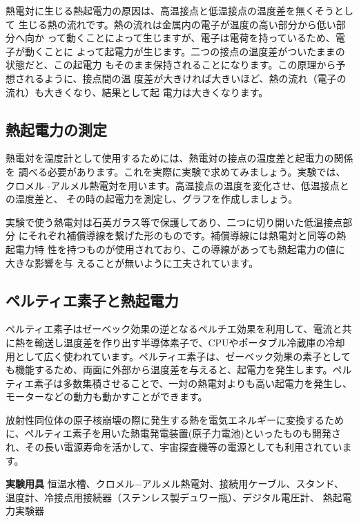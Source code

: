 熱電対に生じる熱起電力の原因は、高温接点と低温接点の温度差を無くそうとして 
生じる熱の流れです。熱の流れは金属内の電子が温度の高い部分から低い部分へ向か 
って動くことによって生じますが、電子は電荷を持っているため、電子が動くことに 
よって起電力が生じます。二つの接点の温度差がついたままの状態だと、この起電力 
もそのまま保持されることになります。この原理から予想されるように、接点間の温
度差が大きければ大きいほど、熱の流れ（電子の流れ）も大きくなり、結果として起 
電力は大きくなります。


\subsection{熱起電力の測定}

熱電対を温度計として使用するためには、熱電対の接点の温度差と起電力の関係を 
調べる必要があります。これを実際に実験で求めてみましょう。実験では、クロメル 
-アルメル熱電対を用います。高温接点の温度を変化させ、低温接点との温度差と、 
その時の起電力を測定し、グラフを作成しましょう。

実験で使う熱電対は石英ガラス等で保護してあり、二つに切り開いた低温接点部分 
にそれぞれ補償導線を繋げた形のものです。補償導線には熱電対と同等の熱起電力特 
性を持つものが使用されており、この導線があっても熱起電力の値に大きな影響を与 
えることが無いように工夫されています。

\subsection{ペルティエ素子と熱起電力}

ペルティエ素子はゼーベック効果の逆となるペルチエ効果を利用して、電流と共に熱を輸送し温度差を作り出す半導体素子で、CPUやポータブル冷蔵庫の冷却用として広く使われています。ペルティエ素子は、ゼーベック効果の素子としても機能するため、両面に外部から温度差を与えると、起電力を発生します。ペルティエ素子は多数集積させることで、一対の熱電対よりも高い起電力を発生し、モーターなどの動力も動かすことができます。

放射性同位体の原子核崩壊の際に発生する熱を電気エネルギーに変換するために、ペルティエ素子を用いた熱電発電装置(原子力電池)といったものも開発され、その長い電源寿命を活かして、宇宙探査機等の電源としても利用されています。

\newpage

\jikken

\begin{itemsquarebox}[c]{\bf 実験用具}
恒温水槽、クロメル−アルメル熱電対、接続用ケーブル、スタンド、
温度計、冷接点用接続器（ステンレス製デュワー瓶）、デジタル電圧計、
熱起電力実験器
\end{itemsquarebox}

